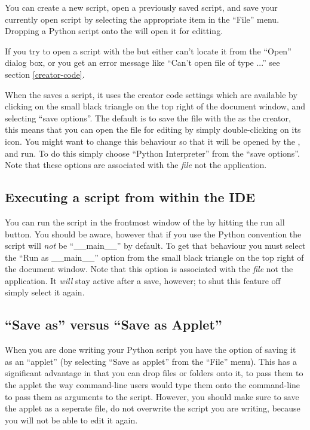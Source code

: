 You can create a new script, open a previously saved script, and save
your currently open script by selecting the appropriate item in the
``File'' menu. Dropping a Python script onto the
 will open it for editting.

If you try to open a script with the  but either
can't locate it from the ``Open'' dialog box, or you get an error
message like ``Can't open file of type ...'' see section
\ref{creator-code}.

When the  saves a script, it uses the creator code
settings which are available by clicking on the small black triangle
on the top right of the document window, and selecting ``save
options''. The default is to save the file with the  as the creator, this means that you can open the file for editing
by simply double-clicking on its icon. You might want to change this
behaviour so that it will be opened by the
, and run. To do this simply choose
``Python Interpreter'' from the ``save options''. Note that these
options are associated with the \emph{file} not the application.


\subsection{Executing a script from within the IDE
            \label{IDEexecution}}

You can run the script in the frontmost window of the  by hitting the run all button.  You should be aware, however that
if you use the Python convention  the
script will \emph{not} be ``__main__'' by default. To get that
behaviour you must select the ``Run as __main__'' option from the
small black triangle on the top right of the document window.  Note
that this option is associated with the \emph{file} not the
application. It \emph{will} stay active after a save, however; to shut
this feature off simply select it again.
 

\subsection{``Save as'' versus ``Save as Applet''
            \label{IDEapplet}}

When you are done writing your Python script you have the option of
saving it as an ``applet'' (by selecting ``Save as applet'' from the
``File'' menu). This has a significant advantage in that you can drop
files or folders onto it, to pass them to the applet the way
command-line users would type them onto the command-line to pass them
as arguments to the script. However, you should make sure to save the
applet as a seperate file, do not overwrite the script you are
writing, because you will not be able to edit it again.

